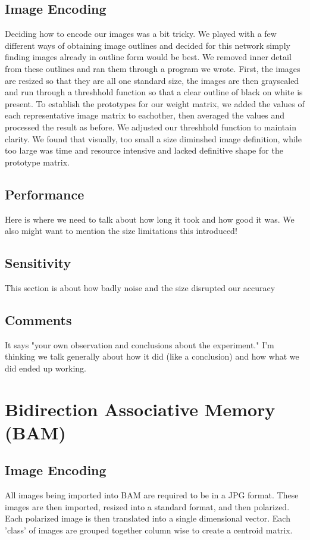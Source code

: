 \documentclass{article}
\begin{document}
\subsection{Image Encoding}
Deciding how to encode our images was a bit tricky.  We played with a few different ways of obtaining image outlines and decided for this network simply finding images already in outline form would be best.  We removed inner detail from these outlines and ran them through a program we wrote.  First, the images are resized so that they are all one standard size,  the images are then grayscaled and run through a threshhold function so that a clear outline of black on white is present.  To establish the prototypes for our weight matrix, we added the values of each representative image matrix to eachother, then averaged the values and processed the result as before.  We adjusted our threshhold function to maintain clarity.  We found that visually, too small a size diminshed image definition, while too large was time and resource intensive and lacked definitive shape for the prototype matrix.

\subsection{Performance}
Here is where we need to talk about how long it took and how good it was. We
also might want to mention the size limitations this introduced!

\subsection{Sensitivity}
This section is about how badly noise and the size disrupted our accuracy

\subsection{Comments}
It says "your own observation and conclusions about the experiment."
I'm thinking we talk generally about how it did (like a conclusion) and how
what we did ended up working.




\section{Bidirection Associative Memory (BAM)}

\subsection{Image Encoding}
All images being imported into BAM are required to be in a JPG format. These
images are then imported, resized into a standard format, and then polarized.
Each polarized image is then translated into a single dimensional vector.
Each 'class' of images are grouped together column wise to create a centroid
matrix.
\end{document}

